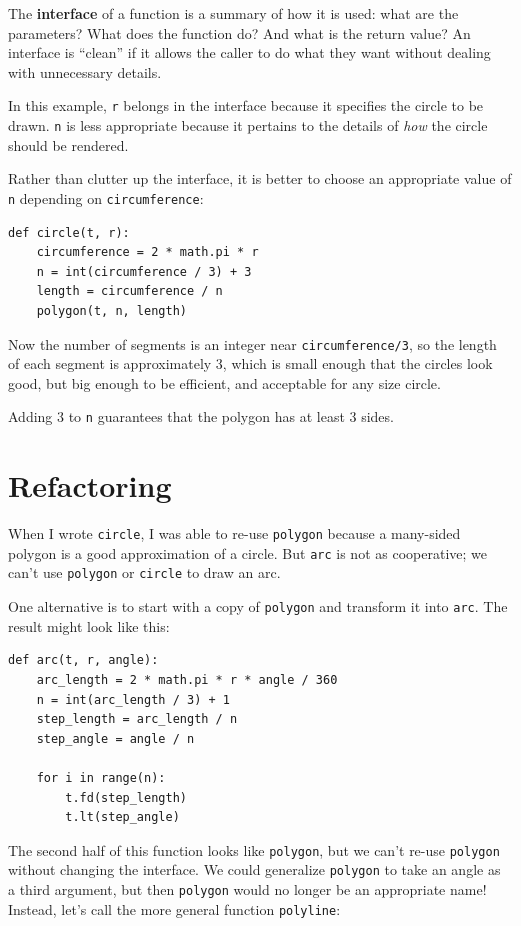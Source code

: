 \documentclass[10pt]{book}
\begin{document}
The {\bf interface} of a function is a summary of how it is used: what
are the parameters?  What does the function do?  And what is the return
value?  An interface is ``clean'' if it allows the caller to do
what they want without dealing with unnecessary details.

In this example, {\tt r} belongs in the interface because it
specifies the circle to be drawn.  {\tt n} is less appropriate
because it pertains to the details of {\em how} the circle should
be rendered.

Rather than clutter up the interface, it is better
to choose an appropriate value of {\tt n}
depending on {\tt circumference}:

\begin{verbatim}
def circle(t, r):
    circumference = 2 * math.pi * r
    n = int(circumference / 3) + 3
    length = circumference / n
    polygon(t, n, length)
\end{verbatim}
%
Now the number of segments is an integer near {\tt circumference/3},
so the length of each segment is approximately 3, which is small
enough that the circles look good, but big enough to be efficient,
and acceptable for any size circle.

Adding 3 to {\tt n} guarantees that the polygon has at least 3 sides.


\section{Refactoring}
\label{refactoring}

When I wrote {\tt circle}, I was able to re-use {\tt polygon}
because a many-sided polygon is a good approximation of a circle.
But {\tt arc} is not as cooperative; we can't use {\tt polygon}
or {\tt circle} to draw an arc.

One alternative is to start with a copy
of {\tt polygon} and transform it into {\tt arc}.  The result
might look like this:

\begin{verbatim}
def arc(t, r, angle):
    arc_length = 2 * math.pi * r * angle / 360
    n = int(arc_length / 3) + 1
    step_length = arc_length / n
    step_angle = angle / n

    for i in range(n):
        t.fd(step_length)
        t.lt(step_angle)
\end{verbatim}
%
The second half of this function looks like {\tt polygon}, but we
can't re-use {\tt polygon} without changing the interface.  We could
generalize {\tt polygon} to take an angle as a third argument,
but then {\tt polygon} would no longer be an appropriate name!
Instead, let's call the more general function {\tt polyline}:
\end{document}
